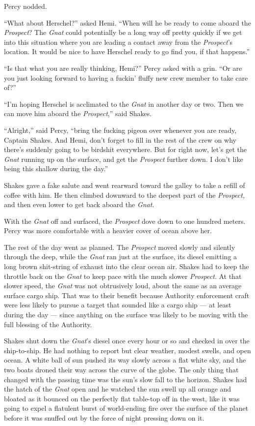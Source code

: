 \documentclass[
]{scrbook}
\begin{document}
Percy nodded.

``What about Herschel?'' asked Hemi. ``When will he be ready to come
aboard the \emph{Prospect}? The \emph{Gnat} could potentially be a long
way off pretty quickly if we get into this situation where you are
leading a contact away from the \emph{Prospect}'s location. It would be
nice to have Herschel ready to go find you, if that happens.''

``Is that what you are really thinking, Hemi?'' Percy asked with a grin.
``Or are you just looking forward to having a fuckin' fluffy new crew
member to take care of?''

``I'm hoping Herschel is acclimated to the \emph{Gnat} in another day or
two. Then we can move him aboard the \emph{Prospect},'' said Shakes.

``Alright,'' said Percy, ``bring the fucking pigeon over whenever you
are ready, Captain Shakes. And Hemi, don't forget to fill in the rest of
the crew on why there's suddenly going to be birdshit everywhere. But
for right now, let's get the \emph{Gnat} running up on the surface, and
get the \emph{Prospect} further down. I don't like being this shallow
during the day.''

Shakes gave a fake salute and went rearward toward the galley to take a
refill of coffee with him. He then climbed downward to the deepest part
of the \emph{Prospect}, and then even lower to get back aboard the
\emph{Gnat}.

With the \emph{Gnat} off and surfaced, the \emph{Prospect} dove down to
one hundred meters. Percy was more comfortable with a heavier cover of
ocean above her.

\bigskip

The rest of the day went as planned. The \emph{Prospect} moved slowly
and silently through the deep, while the \emph{Gnat} ran just at the
surface, its diesel emitting a long brown shit-string of exhaust into
the clear ocean air. Shakes had to keep the throttle back on the
\emph{Gnat} to keep pace with the much slower \emph{Prospect}. At that
slower speed, the \emph{Gnat} was not obtrusively loud, about the same
as an average surface cargo ship. That was to their benefit because
Authority enforcement craft were less likely to pursue a target that
sounded like a cargo ship --- at least during the day --- since anything
on the surface was likely to be moving with the full blessing of the
Authority.

Shakes shut down the \emph{Gnat}'s diesel once every hour or so and
checked in over the ship-to-ship. He had nothing to report but clear
weather, modest swells, and open ocean. A white ball of sun pushed its
way slowly across a flat white sky, and the two boats droned their way
across the curve of the globe. The only thing that changed with the
passing time was the sun's slow fall to the horizon. Shakes had the
hatch of the \emph{Gnat} open and he watched the sun swell up all orange
and bloated as it bounced on the perfectly flat table-top off in the
west, like it was going to expel a flatulent burst of world-ending fire
over the surface of the planet before it was snuffed out by the force of
night pressing down on it.
\end{document}
